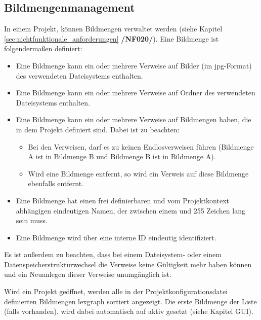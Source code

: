 \subsection{Bildmengenmanagement}

\label{subsec:bildmengenmgmt}
	
	In einem Projekt, können Bildmengen verwaltet werden (siehe Kapitel \ref{sec:nichtfunktionale_anforderungen} \textbf{/NF020/}). Eine Bildmenge ist folgendermaßen definiert:
	
	\begin{itemize}
		
		\item Eine Bildmenge kann ein oder mehrere Verweise auf Bilder (im \gls{jpg}-Format) des verwendeten Dateisystems enthalten.
		
		\item Eine Bildmenge kann ein oder mehrere Verweise auf Ordner des verwendeten Dateisystems enthalten.
		
		\item Eine Bildmenge kann ein oder mehrere Verweise auf Bildmengen haben, die in dem Projekt definiert sind. Dabei ist zu beachten:
		
			\begin{itemize}
			
				\item Bei den Verweisen, darf es zu keinen Endlosverweisen führen (Bildmenge A ist in Bildmenge B und Bildmenge B ist in Bildmenge A).
				
				\item Wird eine Bildmenge entfernt, so wird ein Verweis auf diese Bildmenge ebenfalls entfernt.
			
			\end{itemize}
		
		\item Eine Bildmenge hat einen frei definierbaren und vom Projektkontext abhängigen eindeutigen Namen, der zwischen einem und 255 Zeichen lang sein muss.
		
		\item Eine Bildmenge wird über eine interne ID eindeutig identifiziert.
	
	\end{itemize}
	
	Es ist außerdem zu beachten, dass bei einem Dateisystem- oder einem Datenspeicherstrukturwechsel die Verweise keine Gültigkeit mehr haben können und ein Neuanlegen dieser Verweise unumgänglich ist.\par Wird ein Projekt geöffnet, werden alle in der Projektkonfigurationsdatei definierten Bildmengen \gls{lexgraph} sortiert angezeigt. Die erste Bildmenge der Liste (falls vorhanden), wird dabei automatisch auf aktiv gesetzt (siehe Kapitel GUI).
	
